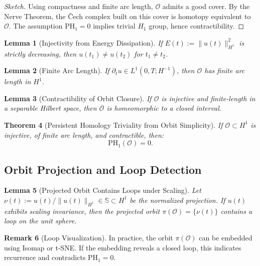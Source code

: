 \documentclass[11pt]{article}
\newtheorem{theorem}{Theorem}[section]
\newtheorem{lemma}[theorem]{Lemma}
\theoremstyle{definition}
\newtheorem{remark}[theorem]{Remark}
\begin{document}
\begin{proof}[Sketch]
Using compactness and finite arc length, $\mathcal{O}$ admits a good cover. By the Nerve Theorem, the Čech complex built on this cover is homotopy equivalent to $\mathcal{O}$. The assumption $\mathrm{PH}_1 = 0$ implies trivial $H_1$ group, hence contractibility.
\end{proof}

\begin{lemma}[Injectivity from Energy Dissipation]
If $E(t) := \|u(t)\|^2_{H^1}$ is strictly decreasing, then $u(t_1) \neq u(t_2)$ for $t_1 \neq t_2$.
\end{lemma}

\begin{lemma}[Finite Arc Length]
If $\partial_t u \in L^1(0,T; H^{-1})$, then $\mathcal{O}$ has finite arc length in $H^1$.
\end{lemma}

\begin{lemma}[Contractibility of Orbit Closure]
If $\mathcal{O}$ is injective and finite-length in a separable Hilbert space, then $\overline{\mathcal{O}}$ is homeomorphic to a closed interval.
\end{lemma}

\begin{theorem}[Persistent Homology Triviality from Orbit Simplicity]
\label{thm:ph1-triviality}
If $\mathcal{O} \subset H^1$ is injective, of finite arc length, and contractible, then:
\[
\mathrm{PH}_1(\mathcal{O}) = 0.
\]
\end{theorem}

\subsection{Orbit Projection and Loop Detection}

\begin{lemma}[Projected Orbit Contains Loops under Scaling]
Let $\nu(t) := u(t)/\|u(t)\|_{H^1} \in \mathbb{S} \subset H^1$ be the normalized projection. If $u(t)$ exhibits scaling invariance, then the projected orbit $\pi(\mathcal{O}) = \{ \nu(t) \}$ contains a loop on the unit sphere.
\end{lemma}

\begin{remark}[Loop Visualization]
In practice, the orbit $\pi(\mathcal{O})$ can be embedded using Isomap or t-SNE. If the embedding reveals a closed loop, this indicates recurrence and contradicts $\mathrm{PH}_1 = 0$.
\end{remark}
\end{document}
